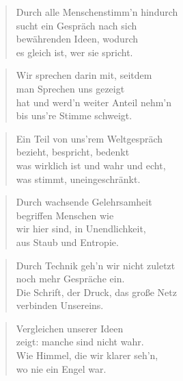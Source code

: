 \documentclass[10pt,a4paper]{article}
\begin{document}
\begin{paracol}{2}
\begin{verse}
Durch alle Menschenstimm’n hindurch \\
sucht ein Gespräch nach sich \\
bewährenden Ideen, wodurch \\
es gleich ist, wer sie spricht. \\
\end{verse}

\begin{verse}
Wir sprechen darin mit, seitdem \\
man Sprechen uns gezeigt \\
hat und werd’n weiter Anteil nehm’n \\
bis uns’re Stimme schweigt. \\
\end{verse}

\begin{verse}
Ein Teil von uns’rem Weltgespräch \\
bezieht, bespricht, bedenkt \\
was wirklich ist und wahr und echt, \\
was stimmt, uneingeschränkt. \\
\end{verse}

\begin{verse}
Durch wachsende Gelehrsamheit \\
begriffen Menschen wie \\
wir hier sind, in Unendlichkeit, \\
aus Staub und Entropie. \\
\end{verse}

\begin{verse}
Durch Technik geh’n wir nicht zuletzt \\
noch mehr Gespräche ein. \\
Die Schrift, der Druck, das große Netz \\
verbinden Unsereins. \\
\end{verse}

\begin{verse}
Vergleichen unserer Ideen \\
zeigt: manche sind nicht wahr. \\
Wie Himmel, die wir klarer seh’n, \\
wo nie ein Engel war. \\
\end{verse}


\end{paracol}
\end{document}
